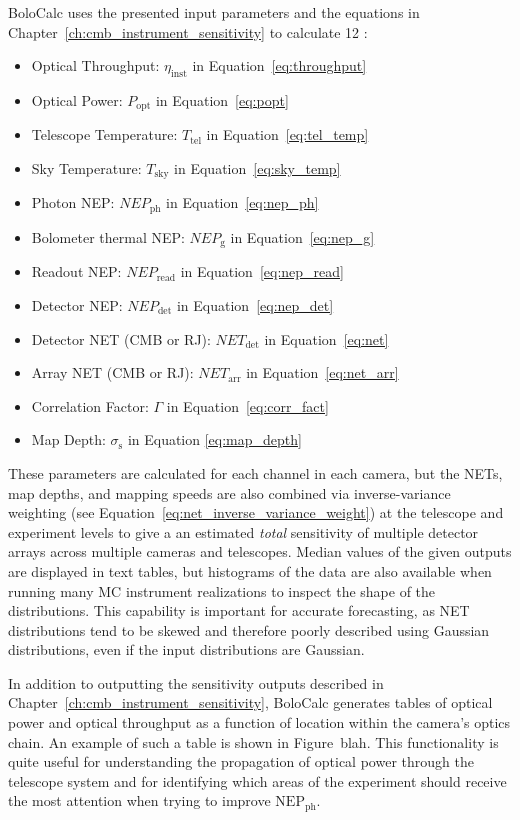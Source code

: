 BoloCalc uses the presented input parameters and the equations in Chapter~\ref{ch:cmb_instrument_sensitivity} to calculate 12 : 
\begin{itemize}
    \item Optical Throughput: $\eta_{\mathrm{inst}}$ in Equation~\ref{eq:throughput}
    \item Optical Power: $P_{\mathrm{opt}}$ in Equation~\ref{eq:popt}
    \item Telescope Temperature: $T_{\mathrm{tel}}$ in Equation~\ref{eq:tel_temp}
    \item Sky Temperature: $T_{\mathrm{sky}}$ in Equation~\ref{eq:sky_temp}
    \item Photon NEP: $NEP_{\mathrm{ph}}$ in Equation~\ref{eq:nep_ph}
    \item Bolometer thermal NEP: $NEP_{\mathrm{g}}$ in Equation~\ref{eq:nep_g}
    \item Readout NEP: $NEP_{\mathrm{read}}$ in Equation~\ref{eq:nep_read}
    \item Detector NEP: $NEP_{\mathrm{det}}$ in Equation~\ref{eq:nep_det}
    \item Detector NET (CMB or RJ): $NET_{\mathrm{det}}$ in Equation~\ref{eq:net}
    \item Array NET (CMB or RJ): $NET_{\mathrm{arr}}$ in Equation~\ref{eq:net_arr}
    \item Correlation Factor: $\Gamma$ in Equation~\ref{eq:corr_fact}
    \item Map Depth: $\sigma_{\mathrm{s}}$ in Equation \ref{eq:map_depth}
\end{itemize}
These parameters are calculated for each channel in each camera, but the NETs, map depths, and mapping speeds are also combined via inverse-variance weighting (see Equation~\ref{eq:net_inverse_variance_weight}) at the telescope and experiment levels to give a an estimated \textit{total} sensitivity of multiple detector arrays across multiple cameras and telescopes. Median values of the given outputs are displayed in text tables, but histograms of the data are also available when running many MC instrument realizations to inspect the shape of the distributions. This capability is important for accurate forecasting, as NET distributions tend to be skewed and therefore poorly described using Gaussian distributions, even if the input distributions are Gaussian. 

In addition to outputting the sensitivity outputs described in Chapter~\ref{ch:cmb_instrument_sensitivity}, BoloCalc generates tables of optical power and optical throughput as a function of location within the camera's optics chain. An example of such a table is shown in Figure~blah. This functionality is quite useful for understanding the propagation of optical power through the telescope system and for identifying which areas of the experiment should receive the most attention when trying to improve $\mathrm{NEP_{ph}}$.

